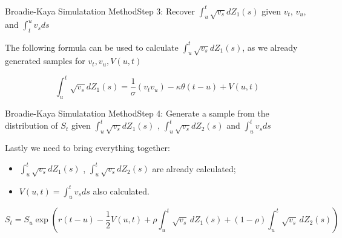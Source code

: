 \begin{frame}{Broadie-Kaya Simulatation Method}{Step 3: Recover $\int_{u}^t \sqrt{v_s} dZ_1(s)$ given $v_t$, $v_u$, and
        $\int_{t}^u v_s ds$}

    The following formula can be used to calculate $\int_{u}^t \sqrt{v_s} dZ_1(s)$, as we already generated samples for $v_t , v_u, V(u, t)$


    \begin{equation}
        \int_{u}^t \sqrt{v_s} dZ_1(s) = \frac{1}{\sigma}(v_t v_u) - \kappa\theta(t-u) + V(u, t)
    \end{equation}
    
    

    
\end{frame}





\begin{frame}{Broadie-Kaya Simulatation Method}{Step 4: Generate a sample from the distribution of $S_t$ given $\int_{u}^t \sqrt{v_s} dZ_1(s)$ , $\int_{u}^t \sqrt{v_s} dZ_2(s)$ and $\int_{u}^t v_s ds$}

    Lastly we need to bring everything together:
    \begin{itemize}
        \item $\int_{u}^t \sqrt{v_s} dZ_1(s)$ , $\int_{u}^t \sqrt{v_s} dZ_2(s)$ are already calculated;
        \item $V(u, t) = \int_{u}^t v_s ds $ also calculated.
    \end{itemize}
    \begin{equation}
        S_t = S_u \exp{\left( r(t-u)-\frac{1}{2} V(u, t)  + \rho\int_{u}^{t} \sqrt{v_s} \, dZ_1(s) + (1-\rho)\int_{u}^{t} \sqrt{v_s} \, dZ_2(s)  \right)}
    \end{equation}

        
\end{frame}


